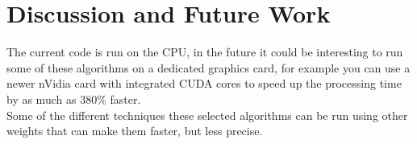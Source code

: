 \section{Discussion and Future Work}
The current code is run on the CPU, in the future it could be interesting to run some of these algorithms on a dedicated graphics card, for example you can use a newer nVidia card with integrated CUDA cores to speed up the processing time by as much as 380\% faster\cite{cuda}.\\
Some of the different techniques these selected algorithms can be run using other weights that can make them faster, but less precise.
